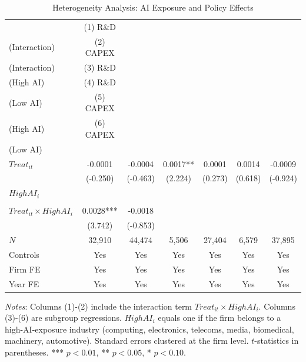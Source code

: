 \begin{table}[htbp]
\centering
\caption{Heterogeneity Analysis: AI Exposure and Policy Effects}
\label{tab:hetero}
\begin{threeparttable}
\begin{tabular}{lcccccc}
\toprule
 & (1) R\&D\\ \small(Interaction) & (2) CAPEX\\ \small(Interaction) & (3) R\&D\\ \small(High AI) & (4) R\&D\\ \small(Low AI) & (5) CAPEX\\ \small(High AI) & (6) CAPEX\\ \small(Low AI) \\
\midrule
$Treat_{it}$ & -0.0001 & -0.0004 & 0.0017** & 0.0001 & 0.0014 & -0.0009 \\
 & (-0.250) & (-0.463) & (2.224) & (0.273) & (0.618) & (-0.924) \\
$HighAI_i$ &  &  &  &  &  &  \\
 &  &  &  &  &  &  \\
$Treat_{it} \times HighAI_i$ & 0.0028*** & -0.0018 &  &  &  &  \\
 & (3.742) & (-0.853) &  &  &  &  \\
\midrule
$N$ & 32,910 & 44,474 & 5,506 & 27,404 & 6,579 & 37,895 \\
Controls & Yes & Yes & Yes & Yes & Yes & Yes \\
Firm FE & Yes & Yes & Yes & Yes & Yes & Yes \\
Year FE & Yes & Yes & Yes & Yes & Yes & Yes \\
\bottomrule
\end{tabular}
\begin{tablenotes}
\small
\item \textit{Notes}: Columns (1)-(2) include the interaction term $Treat_{it} \times HighAI_i$. Columns (3)-(6) are subgroup regressions. $HighAI_i$ equals one if the firm belongs to a high-AI-exposure industry (computing, electronics, telecoms, media, biomedical, machinery, automotive). Standard errors clustered at the firm level. $t$-statistics in parentheses. *** $p<0.01$, ** $p<0.05$, * $p<0.10$.
\end{tablenotes}
\end{threeparttable}
\end{table}